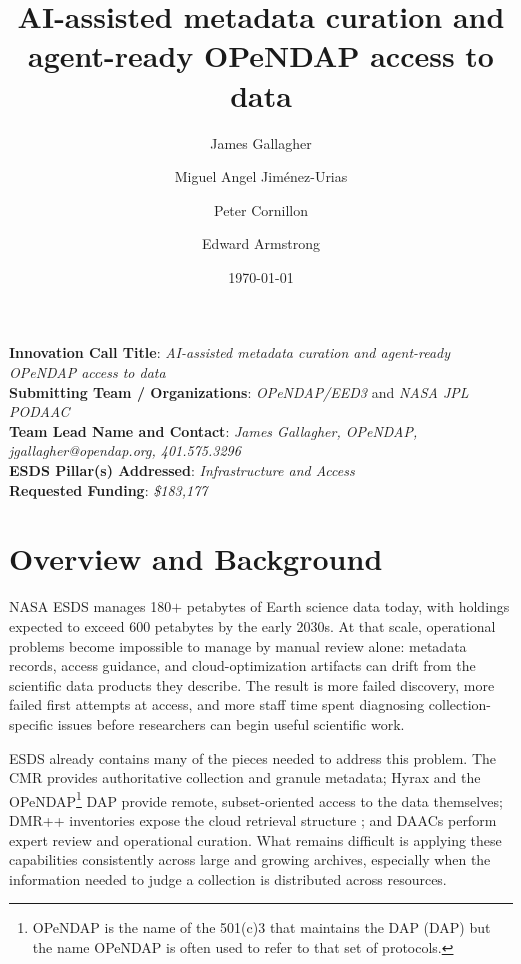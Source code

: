 \documentclass[11pt]{article}
\title{AI-assisted metadata curation and agent-ready OPeNDAP access to data}
\author[1]{James Gallagher}
\author[1]{Miguel Angel Jim\'{e}nez-Urias}
\author[1]{Peter Cornillon}
\author[2]{Edward Armstrong}
\affil[1]{OPeNDAP, Butte, MT}
\affil[2]{NASA JPL PODAAC, Pasadena, CA}
\date{\today}
\begin{document}


\maketitle

\begin{flushleft}
\noindent \textbf{Innovation Call Title}: {\em AI-assisted metadata curation and
agent-ready OPeNDAP access to data}\\
\textbf{Submitting Team / Organizations}: {\em OPeNDAP/EED3} and {\em NASA JPL PODAAC}\\
\textbf{Team Lead Name and Contact}: {\em James Gallagher, {\em OPeNDAP}, jgallagher@opendap.org, 401.575.3296}\\
\textbf{ESDS Pillar(s) Addressed}: {\em Infrastructure and Access}\\
\textbf{Requested Funding}: {\em \$183,177}
\end{flushleft}

\tableofcontents

\thispagestyle{empty} 
\clearpage

\setcounter{page}{1}

\section{Overview and Background}

NASA \ac{ESDS} manages 180$+$ petabytes of Earth science data today, with
holdings expected to exceed 600 petabytes by the early 2030s. At that scale,
operational problems become impossible to manage by manual review alone:
metadata records, access guidance, and cloud-optimization artifacts can drift
from the scientific data products they describe. The result is more failed
discovery, more failed first attempts at access, and more staff time spent
diagnosing collection-specific issues before researchers can begin useful
scientific work.

\ac{ESDS} already contains many of the pieces needed to address this problem.
The \ac{CMR} provides authoritative collection and granule metadata; Hyrax and
the \acs{OPeNDAP}\footnote{\ac{OPeNDAP} is the name of the 501(c)3 that
maintains the \acl{DAP} (DAP) but the name \acs{OPeNDAP} is often used to refer to that set
of protocols.} \ac{DAP} provide remote, subset-oriented access to the data
themselves; \ac{DMR++} inventories expose the cloud retrieval structure \citep{gallagher_2024_14025927}; and
\acp{DAAC} perform expert review and operational curation. What remains
difficult is applying these capabilities consistently across large and growing
archives, especially when the information needed to judge a collection is
distributed across resources.
\end{document}
